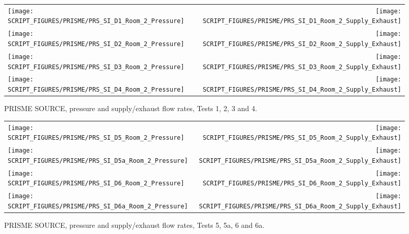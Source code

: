 \newpage

\begin{figure}[p]
\begin{tabular*}{\textwidth}{l@{\extracolsep{\fill}}r}
\texttt{[image: SCRIPT\_FIGURES/PRISME/PRS\_SI\_D1\_Room\_2\_Pressure]} &
\texttt{[image: SCRIPT\_FIGURES/PRISME/PRS\_SI\_D1\_Room\_2\_Supply\_Exhaust]} \\
\texttt{[image: SCRIPT\_FIGURES/PRISME/PRS\_SI\_D2\_Room\_2\_Pressure]} &
\texttt{[image: SCRIPT\_FIGURES/PRISME/PRS\_SI\_D2\_Room\_2\_Supply\_Exhaust]} \\
\texttt{[image: SCRIPT\_FIGURES/PRISME/PRS\_SI\_D3\_Room\_2\_Pressure]} &
\texttt{[image: SCRIPT\_FIGURES/PRISME/PRS\_SI\_D3\_Room\_2\_Supply\_Exhaust]} \\
\texttt{[image: SCRIPT\_FIGURES/PRISME/PRS\_SI\_D4\_Room\_2\_Pressure]} &
\texttt{[image: SCRIPT\_FIGURES/PRISME/PRS\_SI\_D4\_Room\_2\_Supply\_Exhaust]}
\end{tabular*}
\caption[PRISME SOURCE, pressure and supply/exhaust flow rates, Tests 1, 2, 3 and 4]{PRISME SOURCE, pressure and supply/exhaust flow rates, Tests 1, 2, 3 and 4.}
\label{PRISME_SOURCE_Room_2_Pressure_1}
\end{figure}

\begin{figure}[p]
\begin{tabular*}{\textwidth}{l@{\extracolsep{\fill}}r}
\texttt{[image: SCRIPT\_FIGURES/PRISME/PRS\_SI\_D5\_Room\_2\_Pressure]} &
\texttt{[image: SCRIPT\_FIGURES/PRISME/PRS\_SI\_D5\_Room\_2\_Supply\_Exhaust]} \\
\texttt{[image: SCRIPT\_FIGURES/PRISME/PRS\_SI\_D5a\_Room\_2\_Pressure]} &
\texttt{[image: SCRIPT\_FIGURES/PRISME/PRS\_SI\_D5a\_Room\_2\_Supply\_Exhaust]} \\
\texttt{[image: SCRIPT\_FIGURES/PRISME/PRS\_SI\_D6\_Room\_2\_Pressure]} &
\texttt{[image: SCRIPT\_FIGURES/PRISME/PRS\_SI\_D6\_Room\_2\_Supply\_Exhaust]} \\
\texttt{[image: SCRIPT\_FIGURES/PRISME/PRS\_SI\_D6a\_Room\_2\_Pressure]} &
\texttt{[image: SCRIPT\_FIGURES/PRISME/PRS\_SI\_D6a\_Room\_2\_Supply\_Exhaust]}
\end{tabular*}
\caption[PRISME SOURCE, pressure and supply/exhaust flow rates, Tests 5, 5a, 6 and 6a]{PRISME SOURCE, pressure and supply/exhaust flow rates, Tests 5, 5a, 6 and 6a.}
\label{PRISME_SOURCE_Room_2_Pressure_2}
\end{figure}

